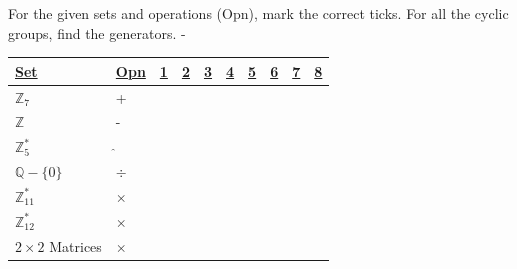 \documentclass[xcolor=svgnames]{beamer}
\begin{document}
\begin{frame}
For the given sets and operations (Opn), mark the correct ticks. For all the cyclic groups, find the generators. - 
\begin{center}
\begin{table}[!ht]
    \centering
\begin{tabular}{|l|l|l|l|l|l|l|l|l|l|}
\hline
{\ul \textbf{Set}} & {\ul \textbf{Opn}} & {\ul \textbf{1}} & {\ul \textbf{2}} & {\ul \textbf{3}} & {\ul \textbf{4}} & {\ul \textbf{5}} & {\ul \textbf{6}} & {\ul \textbf{7}} & {\ul \textbf{8}} \\ \hline
         $\mathbb{Z}_7$          &   +                       &                  &                  &                  &                  &                  &                  &                  &                  \\ \hline
                   
              $\mathbb{Z}$    &     -                     &                  &                  &                  &                  &                  &                  &                  &                  \\ \hline
                   
$\mathbb{Z}_5^*$                  & $\hat{}$                        &              &             &                &                &                &               &                &                \\ \hline

             $\mathbb{Q} - \{0\}$      &    $\div$                      &                  &                  &                  &                  &                  &                  &                  &                  \\ \hline
                   
                  $\mathbb{Z}_{11}^*$ &            $\times$              &                  &                  &                  &                  &                  &                  &                  &                  \\ \hline
                   
                  $\mathbb{Z}_{12}^*$ & $\times$                         &                  &                  &                  &                  &                  &                  &                  &                  \\ \hline
                   
                  $2 \times 2$ Matrices & $\times$                          &                  &                  &                  &                  &                  &                  &                  &                  \\ \hline
                   

\end{tabular}
\end{table}
\end{center}
\end{frame}
\end{document}
